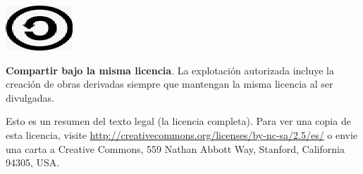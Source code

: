 \begin{center}
{\begin{minipage}{175mm}
\begin{minipage}[t]{20mm}
  \vspace*{0mm}\hspace*{1em}
  \includegraphics[scale=0.35]{licencia/deed_002.png}
\end{minipage}%
\begin{minipage}[t]{15cm}
  \vspace*{-2mm}
  {\bf Compartir bajo la misma licencia}. La explotación autorizada incluye la
  creación de obras derivadas siempre que mantengan la misma licencia al ser
  divulgadas. 
\end{minipage}

\vspace*{1ex}
\end{minipage}}
\end{center}

\vspace*{4ex}

Esto es un resumen del texto legal (la licencia completa). Para ver una copia
de esta licencia, visite 
\href{http://creativecommons.org/licenses/by-nc-sa/2.5/es/}
     {\url{http://creativecommons.org/licenses/by-nc-sa/2.5/es/}}
o envie una carta a Creative Commons, 559 Nathan Abbott Way, Stanford,
California 94305, USA.


